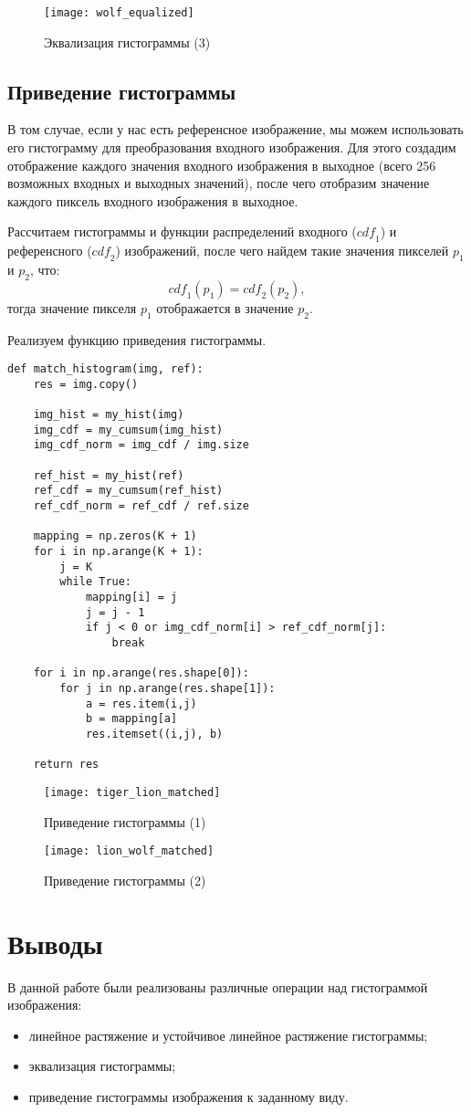 \begin{figure}[H]
	\centering
	\texttt{[image: wolf\_equalized]}
	\caption{Эквализация гистограммы (3)}
\end{figure}

\subsection{Приведение гистограммы}

В том случае, если у нас есть референсное изображение, мы можем использовать его гистограмму для преобразования входного изображения. Для этого создадим отображение каждого значения входного изображения в выходное (всего 256 возможных входных и выходных значений), после чего отобразим значение каждого пиксель входного изображения в выходное. 

Рассчитаем гистограммы и функции распределений входного ($\mathit{cdf_1}$) и референсного ($\mathit{cdf_2}$) изображений, после чего найдем такие значения пикселей $p_1$ и $p_2$, что:
$$
\mathit{cdf_1}(p_1) = \mathit{cdf_2}(p_2),
$$
тогда значение пикселя $p_1$ отображается в значение $p_2$.

Реализуем функцию приведения гистограммы.

\begin{lstlisting}
def match_histogram(img, ref):
	res = img.copy()
	
	img_hist = my_hist(img)
	img_cdf = my_cumsum(img_hist)
	img_cdf_norm = img_cdf / img.size
	
	ref_hist = my_hist(ref)
	ref_cdf = my_cumsum(ref_hist)
	ref_cdf_norm = ref_cdf / ref.size
	
	mapping = np.zeros(K + 1)
	for i in np.arange(K + 1):
		j = K
		while True:
			mapping[i] = j
			j = j - 1
			if j < 0 or img_cdf_norm[i] > ref_cdf_norm[j]:
				break
	
	for i in np.arange(res.shape[0]):
		for j in np.arange(res.shape[1]):
			a = res.item(i,j)
			b = mapping[a]
			res.itemset((i,j), b)
	
	return res
\end{lstlisting}


\begin{figure}[H]
	\centering
	\texttt{[image: tiger\_lion\_matched]}
	\caption{Приведение гистограммы (1)}
\end{figure}

\begin{figure}[H]
	\centering
	\texttt{[image: lion\_wolf\_matched]}
	\caption{Приведение гистограммы (2)}
\end{figure}

\section{Выводы}

В данной работе были реализованы различные операции над гистограммой изображения:

\begin{itemize}
	\item линейное растяжение и устойчивое линейное растяжение гистограммы;
	\item эквализация гистограммы;
	\item приведение гистограммы изображения к заданному виду.
\end{itemize}

